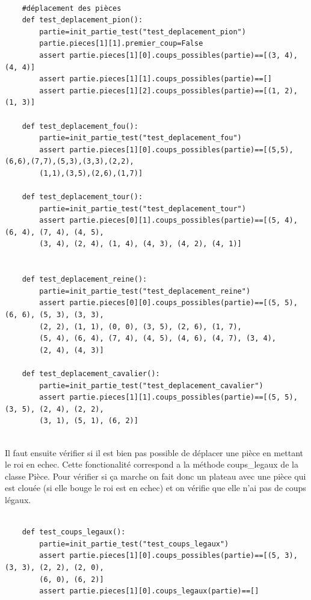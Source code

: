 \documentclass{article}
\begin{document}
\begin{verbatim}

    #déplacement des pièces
    def test_deplacement_pion():
        partie=init_partie_test("test_deplacement_pion")
        partie.pieces[1][1].premier_coup=False
        assert partie.pieces[1][0].coups_possibles(partie)==[(3, 4), (4, 4)]
        assert partie.pieces[1][1].coups_possibles(partie)==[]
        assert partie.pieces[1][2].coups_possibles(partie)==[(1, 2), (1, 3)]
    
    def test_deplacement_fou():
        partie=init_partie_test("test_deplacement_fou")
        assert partie.pieces[1][0].coups_possibles(partie)==[(5,5),(6,6),(7,7),(5,3),(3,3),(2,2),
        (1,1),(3,5),(2,6),(1,7)]
                
    def test_deplacement_tour():
        partie=init_partie_test("test_deplacement_tour")
        assert partie.pieces[0][1].coups_possibles(partie)==[(5, 4), (6, 4), (7, 4), (4, 5), 
        (3, 4), (2, 4), (1, 4), (4, 3), (4, 2), (4, 1)]
    
    
    def test_deplacement_reine():
        partie=init_partie_test("test_deplacement_reine")
        assert partie.pieces[0][0].coups_possibles(partie)==[(5, 5), (6, 6), (5, 3), (3, 3), 
        (2, 2), (1, 1), (0, 0), (3, 5), (2, 6), (1, 7), 
        (5, 4), (6, 4), (7, 4), (4, 5), (4, 6), (4, 7), (3, 4), 
        (2, 4), (4, 3)]
    
    def test_deplacement_cavalier():   
        partie=init_partie_test("test_deplacement_cavalier")
        assert partie.pieces[1][1].coups_possibles(partie)==[(5, 5), (3, 5), (2, 4), (2, 2), 
        (3, 1), (5, 1), (6, 2)]
\end{verbatim}

\\
Il faut ensuite vérifier si il est bien pas possible de déplacer une pièce en mettant le roi en echec. Cette fonctionalité correspond a la méthode coups\_legaux de la classe Pièce. Pour vérifier si ça marche on fait donc un plateau avec une pièce qui est clouée (si elle bouge le roi est en echec) et on vérifie que elle n'ai pas de coups légaux.

\begin{verbatim}

    def test_coups_legaux():
        partie=init_partie_test("test_coups_legaux")
        assert partie.pieces[1][0].coups_possibles(partie)==[(5, 3), (3, 3), (2, 2), (2, 0), 
        (6, 0), (6, 2)]
        assert partie.pieces[1][0].coups_legaux(partie)==[]

\end{verbatim}
\end{document}

